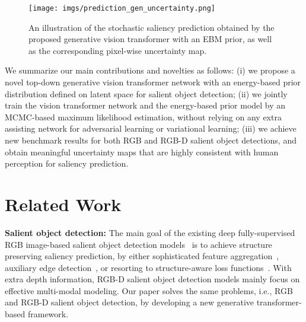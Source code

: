 \documentclass{article}
\begin{document}
\begin{figure*}[h]
   \begin{center}
\texttt{[image: imgs/prediction\_gen\_uncertainty.png]}
   \end{center}
   \vspace{-0.1in}
   \caption{An illustration of the stochastic saliency prediction obtained by the proposed generative vision transformer with an EBM prior, as well as the corresponding pixel-wise uncertainty map.}
\label{fig:framework_outputs}
\end{figure*}

We summarize our main contributions and novelties as follows: (i) we propose a novel top-down generative vision transformer network with an energy-based prior distribution defined on latent space for salient object detection; (ii) we jointly train the vision transformer network and the energy-based prior model by an MCMC-based maximum likelihood estimation, without relying on any extra assisting network for adversarial learning or variational learning; (iii) we achieve new benchmark results for both RGB and RGB-D salient object detections, and obtain meaningful uncertainty maps that are highly consistent with human perception for saliency prediction.














\section{Related Work}


\noindent\textbf{Salient object detection:}
The main goal of the existing deep fully-supervised RGB image-based salient object detection models~\cite{cpd_sal,nldf_sal,scrn_sal,wei2020f3net,wang2020progressive,zhang2020learning_eccv,wei2020label} is to achieve structure preserving saliency prediction, by either 
sophisticated feature aggregation~\cite{cpd_sal,wang2020progressive}, auxiliary edge detection~\cite{scrn_sal,qin2019basnet,wei2020label}, or resorting to structure-aware loss functions~\cite{nldf_sal,wei2020f3net}.
With extra depth information, RGB-D salient object detection models \cite{qu2017rgbd,ucnet_sal,chen2018progressively,ji2021cal,zhao2019Contrast,ssf_rgbd,fan2020bbs,ji2020accurate,piao2019depth,zhang2020bilateral,Sun_2021_CVPR_DSA2F,Zhang_2021_ICCV_RGBD} mainly focus on effective multi-modal modeling. Our paper solves the same problems, i.e., RGB and RGB-D salient object detection, by developing a new generative transformer-based framework.  
\end{document}
